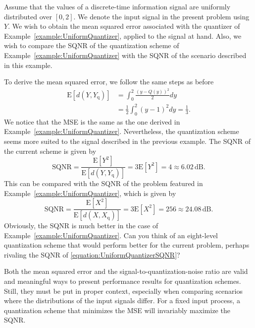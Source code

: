 \begin{example}
Assume that the values of a discrete-time information signal are uniformly distributed over $[0,2]$.
We denote the input signal in the present problem using $Y$.
We wish to obtain the mean squared error associated with the quantizer of Example~\ref{example:UniformQuantizer}, applied to the signal at hand.
Also, we wish to compare the SQNR of the quantization scheme of Example~\ref{example:UniformQuantizer} with the SQNR of the scenario described in this example.

To derive the mean squared error, we follow the same steps as before
\begin{equation*}
\begin{split}
\mathrm{E} [ d(Y, Y_{\mathrm{q}}) ]
&= \int_0^{2} \frac{(y - Q(y))^2}{2} dy \\
&= \frac{1}{2} \int_{0}^{2} (y - 1)^2 dy = \frac{1}{3} .
\end{split}
\end{equation*}
We notice that the MSE is the same as the one derived in Example~\ref{example:UniformQuantizer}.
Nevertheless, the quantization scheme seems more suited to the signal described in the previous example.
The SQNR of the current scheme is given by
\begin{equation*}
\text{SQNR} = \frac{\mathrm{E}[Y^2]}{\mathrm{E} [ d(Y, Y_{\mathrm{q}}) ]}
= 3 \mathrm{E}[Y^2] = 4 \approx 6.02 \, \text{dB}.
\end{equation*}
This can be compared with the SQNR of the problem featured in Example~\ref{example:UniformQuantizer}, which is given by
\begin{equation} \label{equation:UniformQuantizerSQNR}
\text{SQNR} = \frac{\mathrm{E}[X^2]}{\mathrm{E} [ d(X, X_{\mathrm{q}}) ]}
= 3 \mathrm{E}[X^2] = 256 \approx 24.08 \, \text{dB}.
\end{equation}
Obviously, the SQNR is much better in the case of Example~\ref{example:UniformQuantizer}.
Can you think of an eight-level quantization scheme that would perform better for the current problem, perhaps rivaling the SQNR of \eqref{equation:UniformQuantizerSQNR}?
\end{example}

Both the mean squared error and the signal-to-quantization-noise ratio are valid and meaningful ways to present performance results for quantization schemes.
Still, they must be put in proper context, especially when comparing scenarios where the distributions of the input signals differ.
For a fixed input process, a quantization scheme that minimizes the MSE will invariably maximize the SQNR.

